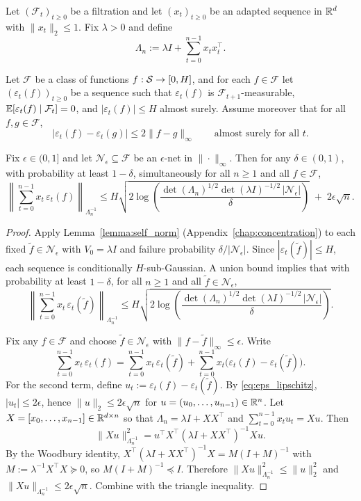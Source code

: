 \begin{lemma}\label{lem:uniform_self_norm_cover_app}
Let $(\mathcal{F}_t)_{t\ge 0}$ be a filtration and let $(x_t)_{t\ge 0}$ be an adapted sequence
in $\mathbb{R}^d$ with $\|x_t\|_2\le 1$.  Fix $\lambda>0$ and define
\[
\Lambda_n := \lambda I+\sum_{t=0}^{n-1} x_tx_t^\top.
\]

Let $\mathcal{F}$ be a class of functions $f:\mathcal{S}\to[0,H]$, and for each $f\in\mathcal{F}$ let
$(\varepsilon_t(f))_{t\ge 0}$ be a sequence such that $\varepsilon_t(f)$ is
$\mathcal{F}_{t+1}$-measurable, $\mathbb{E}[\varepsilon_t(f)\mid \mathcal{F}_t]=0$, and
$|\varepsilon_t(f)|\le H$ almost surely.
Assume moreover that for all $f,g\in\mathcal{F}$,
\begin{equation}\label{eq:eps_lipschitz}
|\varepsilon_t(f)-\varepsilon_t(g)| \le 2\|f-g\|_\infty
\qquad\text{almost surely for all }t.
\end{equation}

Fix $\epsilon\in(0,1]$ and let $\mathcal{N}_\epsilon\subseteq\mathcal{F}$ be an $\epsilon$-net in $\|\cdot\|_\infty$.
Then for any $\delta\in(0,1)$, with probability at least $1-\delta$, simultaneously for all $n\ge 1$
and all $f\in\mathcal{F}$,
\[
\left\|\sum_{t=0}^{n-1} x_t\,\varepsilon_t(f)\right\|_{\Lambda_n^{-1}}
\le
H\sqrt{2\log\!\left(\frac{\det(\Lambda_n)^{1/2}\det(\lambda I)^{-1/2}\,|\mathcal{N}_\epsilon|}{\delta}\right)}
\;+\;
2\epsilon\sqrt{n}.
\]
\end{lemma}

\begin{proof}
Apply Lemma~\ref{lemma:self_norm} (Appendix~\ref{chap:concentration}) to each fixed $\tilde f\in\mathcal{N}_\epsilon$
with $V_0=\lambda I$ and failure probability $\delta/|\mathcal{N}_\epsilon|$.
Since $|\varepsilon_t(\tilde f)|\le H$, each sequence is conditionally $H$-sub-Gaussian.
A union bound implies that with probability at least $1-\delta$, for all $n\ge 1$ and all $\tilde f\in\mathcal{N}_\epsilon$,
\[
\left\|\sum_{t=0}^{n-1} x_t\,\varepsilon_t(\tilde f)\right\|_{\Lambda_n^{-1}}
\le
H\sqrt{2\log\!\left(\frac{\det(\Lambda_n)^{1/2}\det(\lambda I)^{-1/2}\,|\mathcal{N}_\epsilon|}{\delta}\right)}.
\]

Fix any $f\in\mathcal{F}$ and choose $\tilde f\in\mathcal{N}_\epsilon$ with $\|f-\tilde f\|_\infty\le \epsilon$.
Write
\[
\sum_{t=0}^{n-1} x_t\,\varepsilon_t(f)
=
\sum_{t=0}^{n-1} x_t\,\varepsilon_t(\tilde f)
+
\sum_{t=0}^{n-1} x_t\big(\varepsilon_t(f)-\varepsilon_t(\tilde f)\big).
\]
For the second term, define $u_t:=\varepsilon_t(f)-\varepsilon_t(\tilde f)$.
By \eqref{eq:eps_lipschitz}, $|u_t|\le 2\epsilon$, hence $\|u\|_2\le 2\epsilon\sqrt{n}$
for $u=(u_0,\dots,u_{n-1})\in\mathbb{R}^n$.
Let $X=[x_0,\dots,x_{n-1}]\in\mathbb{R}^{d\times n}$ so that $\Lambda_n=\lambda I+XX^\top$ and $\sum_{t=0}^{n-1}x_tu_t=Xu$.
Then
\[
\|Xu\|_{\Lambda_n^{-1}}^2
=
u^\top X^\top (\lambda I+XX^\top)^{-1} X u.
\]
By the Woodbury identity,
$X^\top (\lambda I+XX^\top)^{-1}X = M(I+M)^{-1}$ with $M:=\lambda^{-1}X^\top X\succeq 0$,
so $M(I+M)^{-1}\preceq I$. Therefore $\|Xu\|_{\Lambda_n^{-1}}^2\le \|u\|_2^2$ and
$\|Xu\|_{\Lambda_n^{-1}}\le 2\epsilon\sqrt{n}$.
Combine with the triangle inequality.
\end{proof}

